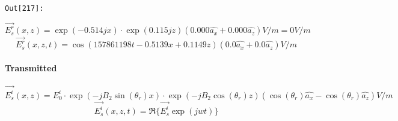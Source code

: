 \documentclass[11pt]{article}
\begin{document}
\texttt{\color{outcolor}Out[{\color{outcolor}217}]:}
    
    \[\vec{E^r_s}(x,z) = \exp(-0.514jx)\cdot\exp(0.115jz)(0.000\hat{a_x}+0.000\hat{a_z})V/m=0V/m\]
\[\vec{E^r_s}(x,z,t) = \cos(157861198t-0.5139x+0.1149z)(0.0\hat{a_x}+0.0\hat{a_z}) V/m\]

    

    \paragraph{Transmitted}\label{transmitted}

    \[\vec{E^i_s}(x,z) = E^i_0\cdot\exp(-jB_2\sin(\theta_r){x})\cdot\exp(-jB_2\cos(\theta_r)z)(\cos(\theta_r)\hat{{a_x}}-\cos(\theta_r)\hat{{a_z}})V/m\]
\[\vec{E^i_s}(x,z,t) = \Re\{\vec{E^i_s}\exp(jwt)\}\]
\end{document}
